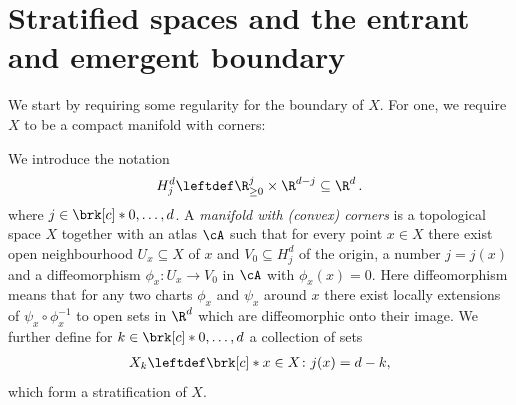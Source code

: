 



\section{Stratified spaces and the entrant and emergent boundary}

We start by requiring some regularity for the boundary of $X$.
For one, we require $X$ to be a compact manifold with corners:
\begin{definition}
  We introduce the notation
  \begin{align*}
    H_j^d\leftdef\R_{\geq0}^j\times\R^{d-j}\subseteq\R^d\,.
  \end{align*}
  where $j\in\brk[c]*{0,\dots,d}$.
  A \emph{manifold with (convex) corners} is a topological space $X$ together with an atlas $\cA$ such that for every point
  $x\in X$ there exist open neighbourhood $U_x\subseteq X$ of $x$ and $V_0\subseteq H_j^d$ of the origin, a number $j=j(x)$ and a
  diffeomorphism $\phi_x\colon U_x\to V_0$ in $\cA$ with $\phi_x(x)=0$.
  Here diffeomorphism means that for any two charts $\phi_x$ and $\psi_x$ around $x$ there
  exist locally extensions of $\psi_x\circ\phi_x^{-1}$ to open sets
  in $\R^d$ which are diffeomorphic onto their image.
  We further define for $k\in\brk[c]*{0,\dots,d}$ a collection of sets 
  \begin{align}
    X_k\leftdef\brk[c]*{x\in X\colon j(x)=d-k}\label{eq:def_mfCorners_stratification},
  \end{align}
  which form a stratification of $X$.
\end{definition}

